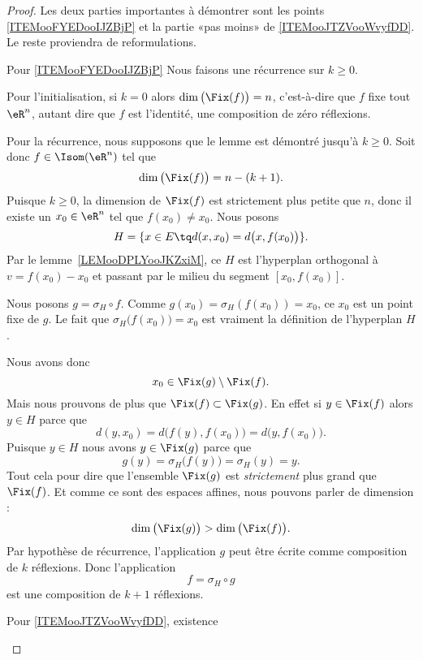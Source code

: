 \begin{proof}
	Les deux parties importantes à démontrer sont les points \ref{ITEMooFYEDooIJZBjP} et la partie «pas moins» de \ref{ITEMooJTZVooWvyfDD}. Le reste proviendra de reformulations.
	\begin{subproof}
		\item[Pour \ref{ITEMooFYEDooIJZBjP}]
		Nous faisons une récurrence sur \( k\geq 0\).

		Pour l'initialisation, si \( k=0\) alors \( \dim\big( \Fix(f) \big)=n\), c'est-à-dire que \( f\) fixe tout \( \eR^n\), autant dire que \( f\) est l'identité, une composition de zéro réflexions.

		Pour la récurrence, nous supposons que le lemme est démontré jusqu'à \( k\geq 0\). Soit donc \( f\in\Isom(\eR^n)\) tel que
		\begin{equation}
			\dim\big( \Fix(f) \big)=n-(k+1).
		\end{equation}
		Puisque \( k\geq 0\), la dimension de \( \Fix(f)\) est strictement plus petite que \( n\), donc il existe un \( x_0\in \eR^n\) tel que \( f(x_0)\neq x_0\). Nous posons
		\begin{equation}
			H=\{ x\in E\tq d(x,x_0)=d\big( x,f(x_0) \big)  \}.
		\end{equation}
		Par le lemme~\ref{LEMooDPLYooJKZxiM}, ce \( H\) est l'hyperplan orthogonal à \( v=f(x_0)-x_0\) et passant par le milieu du segment \( [x_0,f(x_0)]\).

		Nous posons \( g=\sigma_H\circ f\). Comme \( g(x_0)=\sigma_H(f(x_0))=x_0\), ce \( x_0\) est un point fixe de \( g\). Le fait que \( \sigma_H\big( f(x_0) \big)=x_0\) est vraiment la définition de l'hyperplan \( H\).

		Nous avons donc
		\begin{equation}
			x_0\in\Fix(g)\setminus\Fix(f).
		\end{equation}
		Mais nous prouvons de plus que \( \Fix(f)\subset\Fix(g)\). En effet si \( y\in \Fix(f)\) alors \( y\in H\) parce que
		\begin{equation}
			d(y,x_0)=d\big( f(y),f(x_0) \big)=d\big( y, f(x_0) \big).
		\end{equation}
		Puisque \( y\in H\) nous avons \( y\in \Fix(g)\) parce que
		\begin{equation}
			g(y)=\sigma_H\big( f(y) \big)=\sigma_H(y)=y.
		\end{equation}
		Tout cela pour dire que l'ensemble \( \Fix(g)\) est \emph{strictement} plus grand que \( \Fix(f)\). Et comme ce sont des espaces affines, nous pouvons parler de dimension :
		\begin{equation}
			\dim\big( \Fix(g) \big)>\dim\big( \Fix(f) \big).
		\end{equation}
		Par hypothèse de récurrence, l'application \(  g\) peut être écrite comme composition de \( k\) réflexions. Donc l'application
		\begin{equation}
			f=\sigma_H\circ g
		\end{equation}
		est une composition de \( k+1\) réflexions.
		\item[Pour \ref{ITEMooJTZVooWvyfDD}, existence]


\end{subproof}
\end{proof}
